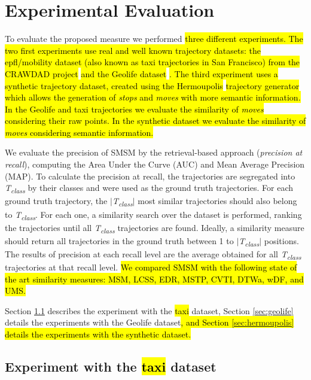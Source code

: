 \documentclass[12pt]{article}
\begin{document}
\section{Experimental Evaluation} \label{sec:experiments}
To evaluate the proposed measure we performed \hl{three different experiments. The two first experiments use real and well known trajectory datasets: the epfl/mobility dataset (also known as taxi trajectories in San Francisco) from the CRAWDAD project }\citep{epfl-mobility-20090224}\hl{ and the Geolife dataset }\citep{zheng2009mining}\hl{. The third experiment uses a synthetic trajectory dataset, created using the Hermoupolis }\citep{Pelekis-Hermoupolis}\hl{ trajectory generator which allows the generation of \emph{stops} and \emph{moves} with more semantic information. In the Geolife and taxi trajectories we evaluate the similarity of \emph{moves} considering their raw points. In the synthetic dataset we evaluate the similarity of \emph{moves} considering semantic information.}

We evaluate the precision of SMSM by the retrieval-based approach (\textit{precision at recall}), computing the Area Under the Curve (AUC) and Mean Average Precision (MAP). To calculate the precision at recall, the trajectories are segregated into \textit{T\textsubscript{class}} by their classes and were used as the ground truth trajectories. For each ground truth trajectory, the $|$\textit{T\textsubscript{class}}$|$ most similar trajectories should also belong to \textit{T\textsubscript{class}}. For each one, a similarity search over the dataset is performed, ranking the trajectories until all \textit{T\textsubscript{class}} trajectories are found. Ideally, a similarity measure should return all trajectories in the ground truth between 1 to $|$\textit{T\textsubscript{class}}$|$ positions. The results of precision at each recall level are the average obtained for all \textit{T\textsubscript{class}} trajectories at that recall level. \hl{We compared SMSM with the following state of the art similarity measures: MSM, LCSS, EDR, MSTP, CVTI, DTWa, wDF, and UMS.}

Section \ref{sec:crawdad} describes the experiment with the \hl{taxi} dataset, Section \ref{sec:geolife} details the experiments with the Geolife dataset\hl{, and Section {\ref{sec:hermoupolis}} details the experiments with the synthetic dataset.}

\subsection{Experiment with the \hl{taxi} dataset}\label{sec:crawdad}
\end{document}
